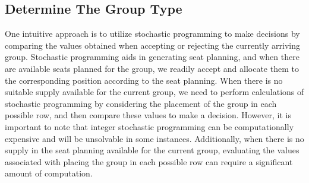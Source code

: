 







\subsection{Determine The Group Type}\label{nested_policy}
One intuitive approach is to utilize stochastic programming to make decisions by comparing the values obtained when accepting or rejecting the currently arriving group. Stochastic programming aids in generating seat planning, and when there are available seats planned for the group, we readily accept and allocate them to the corresponding position according to the seat planning. When there is no suitable supply available for the current group, we need to perform calculations of stochastic programming by considering the placement of the group in each possible row, and then compare these values to make a decision. However, it is important to note that integer stochastic programming can be computationally expensive and will be unsolvable in some instances. Additionally, when there is no supply in the seat planning available for the current group, evaluating the values associated with placing the group in each possible row can require a significant amount of computation.

